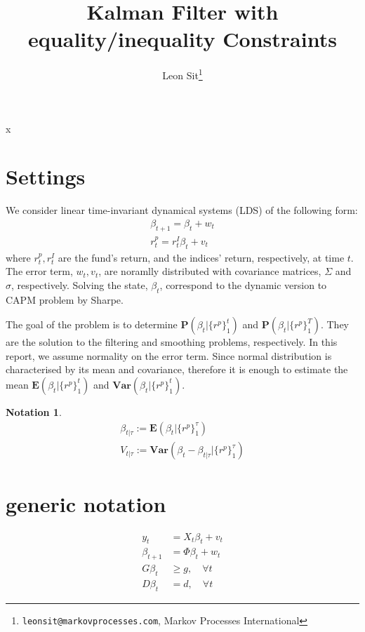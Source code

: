 \message{ !name(kalman_filter.tex)}x\documentclass{article}
\title{Kalman Filter with equality/inequality Constraints}
\author{Leon Sit\footnote{\texttt{leonsit@markovprocesses.com}, Markov Processes International}}
\numberwithin{algorithm}{section}
\theoremstyle{plain}
\theoremstyle{definition}
\newtheorem{notation}[thm]{Notation}\small
\theoremstyle{remark}
\newcommand{\E}{\mathbf{E}}
\newcommand{\Var}{\mathbf{Var}}
\newcommand{\PP}{\mathbf{P}}
\begin{document}


\renewcommand{\baselinestretch}{1.5}

\maketitle
\tableofcontents
\listofalgorithms
\section{Settings}
We consider linear time-invariant dynamical systems (LDS) of the following form:
\begin{eqnarray}
\beta_{t+1} =  \beta_{t} + w_t\\
r^p_t = r^I_t \beta_t + v_t
\label{lds}
\end{eqnarray}
where $r^p_t, r^I_t$ are the fund's return, and the indices' return, respectively, at time $t$. The error term, $w_t, v_t$, are noramlly distributed with covariance matrices, $\Sigma$ and $\sigma$, respectively. Solving the state, $\beta_t$, correspond to the dynamic version to CAPM problem by Sharpe. 

The goal of the problem is to determine $\PP(\beta_t | \{ r^p\}_1^{t})$ and $\PP(\beta_t | \{ r^p\}_1^{T})$. They are the solution to the filtering and smoothing problems, respectively. In this report, we assume normality on the error term. Since normal distribution is characterised by its mean and covariance, therefore it is enough to estimate the mean $\E(\beta_t | \{ r^p\}_1^{t})$ and $\Var(\beta_t | \{ r^p\}_1^{t})$.

\begin{notation}
\begin{eqnarray*}
\beta_{t|\tau} := \E(\beta_t | \{ r^p \} ^ \tau _ 1 )\\
V_{t|\tau} := \Var(\beta_t - \beta_{t|\tau} | \{ r^p \} ^ \tau _ 1 ) 
\end{eqnarray*}
\end{notation}


\section{generic notation}
\begin{equation}
\begin{split}
y_t &= X_t \beta_t + v_t\\
\beta_{t+1} &= \Phi \beta_{t} + w_t\\
G \beta_t &\geq g, \quad \forall t\\
D \beta_t &= d, \quad \forall t
\end{split}
\end{equation}
\end{document}

